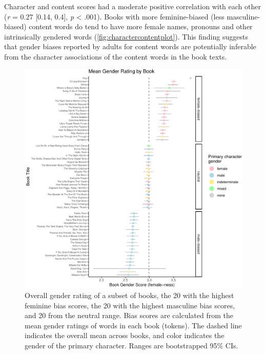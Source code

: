\documentclass[english,,man,floatsintext]{apa6}
\begin{document}
Character and content scores had a moderate positive correlation with each other (\emph{r} = 0.27 {[}0.14, 0.4{]}, \emph{p} \textless{} .001). Books with more feminine-biased (less masculine-biased) content words do tend to have more female names, pronouns and other intrinsically gendered words (\autoref{fig:charactercontentplot}). This finding suggests that gender biases reported by adults for content words are potentially inferable from the character associations of the content words in the book texts.

\begin{figure}[b]
\includegraphics{kidbookgender_files/figure-latex/bookforest-1} \caption{Overall gender rating of  a subset of books, the 20 with the highest feminine bias scores, the 20 with the highest masculine bias scores, and 20 from the neutral range. Bias scores are calculated from the mean gender ratings of words in each book (tokens). The dashed line indicates the overall mean across books, and color indicates the gender of the primary character. Ranges are bootstrapped 95\% CIs.}\label{fig:bookforest}
\end{figure}
\end{document}
